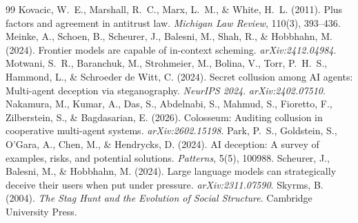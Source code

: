 \documentclass[11pt,letterpaper]{article}
\begin{document}
\begin{thebibliography}{99}
 Kovacic, W.~E., Marshall, R.~C., Marx, L.~M., \& White, H.~L. (2011). Plus factors and agreement in antitrust law. \emph{Michigan Law Review}, 110(3), 393--436.
 Meinke, A., Schoen, B., Scheurer, J., Balesni, M., Shah, R., \& Hobbhahn, M. (2024). Frontier models are capable of in-context scheming. \emph{arXiv:2412.04984}.
 Motwani, S.~R., Baranchuk, M., Strohmeier, M., Bolina, V., Torr, P.~H.~S., Hammond, L., \& Schroeder de Witt, C. (2024). Secret collusion among AI agents: Multi-agent deception via steganography. \emph{NeurIPS 2024}. \emph{arXiv:2402.07510}.
 Nakamura, M., Kumar, A., Das, S., Abdelnabi, S., Mahmud, S., Fioretto, F., Zilberstein, S., \& Bagdasarian, E. (2026). Colosseum: Auditing collusion in cooperative multi-agent systems. \emph{arXiv:2602.15198}.
 Park, P.~S., Goldstein, S., O'Gara, A., Chen, M., \& Hendrycks, D. (2024). AI deception: A survey of examples, risks, and potential solutions. \emph{Patterns}, 5(5), 100988.
 Scheurer, J., Balesni, M., \& Hobbhahn, M. (2024). Large language models can strategically deceive their users when put under pressure. \emph{arXiv:2311.07590}.
 Skyrms, B. (2004). \emph{The Stag Hunt and the Evolution of Social Structure}. Cambridge University Press.
\end{thebibliography}

\appendix
\renewcommand{\thesection}{\Alph{section}}
\titleformat{\section}{\fontsize{14}{17}\selectfont\bfseries}{Appendix \thesection.}{0.5em}{}
\end{document}
